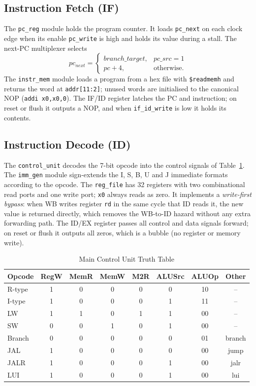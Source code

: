 \subsection{Instruction Fetch (IF)}
The \texttt{pc\_reg} module holds the program counter. It loads
\texttt{pc\_next} on each clock edge when its enable \texttt{pc\_write} is high and holds
its value during a stall. The next-PC multiplexer selects
\begin{equation}
pc_{next} = \begin{cases} branch\_target, & pc\_src = 1\\ pc + 4, & \text{otherwise.}\end{cases}
\end{equation}
The \texttt{instr\_mem} module loads a program from a hex file with
\texttt{\$readmemh} and returns the word at \texttt{addr[11:2]}; unused words are
initialised to the canonical NOP (\texttt{addi x0,x0,0}). The IF/ID register latches the
PC and instruction; on reset or flush it outputs a NOP, and when \texttt{if\_id\_write}
is low it holds its contents.

\subsection{Instruction Decode (ID)}
The \texttt{control\_unit} decodes the 7-bit opcode into the control signals of
Table~\ref{tab:ctrl}. The \texttt{imm\_gen} module sign-extends the I, S, B, U and J
immediate formats according to the opcode. The \texttt{reg\_file} has 32 registers with
two combinational read ports and one write port; \texttt{x0} always reads as zero.
It implements a \emph{write-first bypass}: when WB writes register \texttt{rd} in the same
cycle that ID reads it, the new value is returned directly, which removes the WB-to-ID
hazard without any extra forwarding path. The ID/EX register passes all control and data
signals forward; on reset or flush it outputs all zeros, which is a bubble (no register
or memory write).

\begin{table}[!t]
\centering
\caption{Main Control Unit Truth Table}
\label{tab:ctrl}
\setlength{\tabcolsep}{2.6pt}
\renewcommand{\arraystretch}{1.1}
\begin{tabular}{@{}lccccccc@{}}
\toprule
\textbf{Opcode} & \textbf{RegW} & \textbf{MemR} & \textbf{MemW} & \textbf{M2R} & \textbf{ALUSrc} & \textbf{ALUOp} & \textbf{Other} \\ \midrule
R-type & 1 & 0 & 0 & 0 & 0 & 10 & -- \\
I-type & 1 & 0 & 0 & 0 & 1 & 11 & -- \\
LW     & 1 & 1 & 0 & 1 & 1 & 00 & -- \\
SW     & 0 & 0 & 1 & 0 & 1 & 00 & -- \\
Branch & 0 & 0 & 0 & 0 & 0 & 01 & branch \\
JAL    & 1 & 0 & 0 & 0 & 0 & 00 & jump \\
JALR   & 1 & 0 & 0 & 0 & 1 & 00 & jalr \\
LUI    & 1 & 0 & 0 & 0 & 1 & 00 & lui \\ \bottomrule
\end{tabular}
\end{table}


